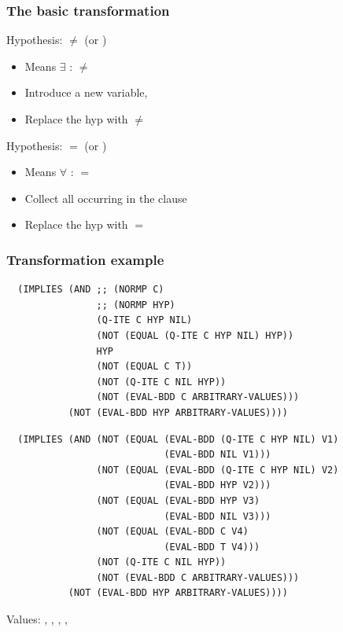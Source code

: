 \begin{frame}[fragile]
\frametitle{The basic transformation}

Hypothesis:  $\neq$   (or )
\begin{itemize}
\item Means $\exists$  :  $\neq$ 
\item Introduce a new variable, 
\item Replace the hyp with  $\neq$  
\end{itemize}

\SmallSkip

Hypothesis:  $=$    (or )
\begin{itemize}
\item Means $\forall$  :  $=$  
\item Collect all  occurring in the clause
\item Replace the hyp with  $=$  
\end{itemize}

\end{frame}


\begin{frame}[fragile]
\frametitle{Transformation example}

\begin{verbatim}
  (IMPLIES (AND ;; (NORMP C)
                ;; (NORMP HYP)
                (Q-ITE C HYP NIL)
                (NOT (EQUAL (Q-ITE C HYP NIL) HYP))
                HYP
                (NOT (EQUAL C T))
                (NOT (Q-ITE C NIL HYP))
                (NOT (EVAL-BDD C ARBITRARY-VALUES)))
           (NOT (EVAL-BDD HYP ARBITRARY-VALUES))))
\end{verbatim}

\end{frame}


\begin{frame}[fragile]

\begin{verbatim}
  (IMPLIES (AND (NOT (EQUAL (EVAL-BDD (Q-ITE C HYP NIL) V1)
                            (EVAL-BDD NIL V1)))
                (NOT (EQUAL (EVAL-BDD (Q-ITE C HYP NIL) V2)
                            (EVAL-BDD HYP V2)))
                (NOT (EQUAL (EVAL-BDD HYP V3)
                            (EVAL-BDD NIL V3)))
                (NOT (EQUAL (EVAL-BDD C V4)
                            (EVAL-BDD T V4)))
                (NOT (Q-ITE C NIL HYP))
                (NOT (EVAL-BDD C ARBITRARY-VALUES)))
           (NOT (EVAL-BDD HYP ARBITRARY-VALUES))))
\end{verbatim}

Values: , , , , 

\end{frame}


